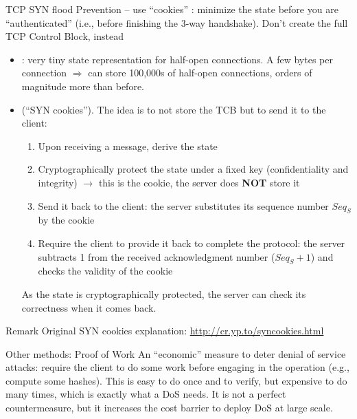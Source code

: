\begin{parag}{TCP SYN flood Prevention -- use ``cookies''}
    : minimize the state before you are ``authenticated'' (i.e., before finishing the 3-way handshake). Don't create the full TCP Control Block, instead
	\begin{itemize}
	    \item {}: very tiny state representation for half-open connections. A few bytes per connection $\Rightarrow$ can store 100,000s of half-open connections, orders of magnitude more than before.
	    \item {} (``SYN cookies''). The idea is to not store the TCB but to send it to the client:
			\begin{enumerate}
			    \item Upon receiving a message, derive the state
			    \item Cryptographically protect the state under a fixed key (confidentiality and integrity) $\to$ this is the cookie, the server does \textbf{NOT} store it
			    \item Send it back to the client: the server substitutes its sequence number $Seq_S$ by the cookie
			    \item Require the client to provide it back to complete the protocol: the server subtracts 1 from the received acknowledgment number ($Seq_S + 1$) and checks the validity of the cookie
			\end{enumerate}
			As the state is cryptographically protected, the server can check its correctness when it comes back.
	\end{itemize}
	\begin{subparag}{Remark}
	    Original SYN cookies explanation: \url{http://cr.yp.to/syncookies.html}
	\end{subparag}
\end{parag}

\begin{parag}{Other methods: Proof of Work}
    An ``economic'' measure to deter denial of service attacks: require the client to do some work before engaging in the operation (e.g., compute some hashes). This is easy to do once and to verify, but expensive to do many times, which is exactly what a DoS needs. It is not a perfect countermeasure, but it increases the cost barrier to deploy DoS at large scale.
\end{parag}

